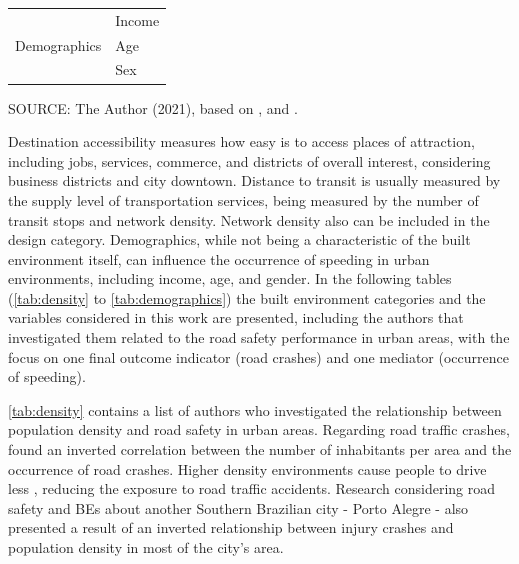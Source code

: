 \begin{table}[!hbtp]
\begin{tabular}{ll}
                                                    \hline
        \multirow{3}{*}{Demographics}              & Income                                   \\
                                                   & Age                                      \\
                                                   & Sex                                      \\ \hline
        \end{tabular}
    \label{tab:6d}
    \par \vspace{2mm} \footnotesize \raggedright
    SOURCE: The Author (2021), based on \textcite{Ewing2009}, \textcite{Ewing2010} and \textcite{Obelheiro2020}.
\end{table}

Destination accessibility measures how easy is to access places of attraction, including jobs, services, commerce, and districts of overall interest, considering business districts and city downtown. Distance to transit is usually measured by the supply level of transportation services, being measured by the number of transit stops and network density. Network density also can be included in the design category. Demographics, while not being a characteristic of the built environment itself, can influence the occurrence of speeding in urban environments, including income, age, and gender. In the following tables (\autoref{tab:density} to \autoref{tab:demographics}) the built environment categories and the variables considered in this work are presented, including the authors that investigated them related to the road safety performance in urban areas, with the focus on one final outcome indicator (road crashes) and one mediator (occurrence of speeding).



\autoref{tab:density} contains a list of authors who investigated the relationship between population density and road safety in urban areas. Regarding road traffic crashes, \textcite{Dumbaugh2009, Obelheiro2020} found an inverted correlation between the number of inhabitants per area and the occurrence of road crashes. Higher density environments cause people to drive less \cite{Dumbaugh2009}, reducing the exposure to road traffic accidents. Research considering road safety and BEs about another Southern Brazilian city - Porto Alegre - also presented a result of an inverted relationship between injury crashes and population density in most of the city's area.

